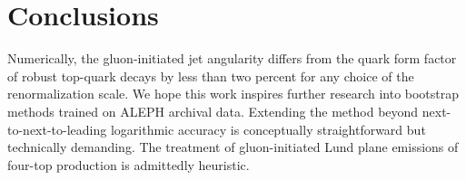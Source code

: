 \section{Conclusions}\label{sec:conclusions}

Numerically, the gluon-initiated jet angularity differs from the quark
form factor of robust top-quark decays by less than two percent for any
choice of the renormalization scale. We hope this work inspires further
research into bootstrap methods trained on ALEPH archival data.
Extending the method beyond next-to-next-to-leading logarithmic accuracy
is conceptually straightforward but technically demanding. The treatment
of gluon-initiated Lund plane emissions of four-top production is
admittedly heuristic.

